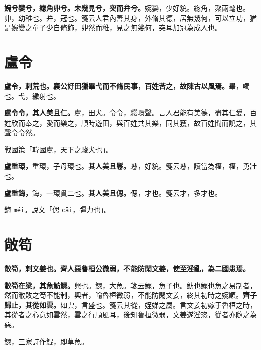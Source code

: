 \textbf{婉兮孌兮，緫角丱兮。未幾見兮，突而弁兮。}{\footnotesize 婉孌，少好貌。緫角，聚兩髦也。丱，幼稚也。弁，冠也。箋云人君內善其身，外脩其德，居無幾何，可以立功，猶是婉孌之童子少自脩飾，丱然而稚，見之無幾何，突耳加冠為成人也。}

\section{盧令}


\textbf{盧令，刺荒也。襄公好田獵畢弋而不脩民事，百姓苦之，故陳古以風焉。}{\footnotesize 畢，噣也。弋，繳射也。}

\textbf{盧令令，其人美且仁。}{\footnotesize 盧，田犬。令令，纓環聲。言人君能有美德，盡其仁愛，百姓欣而奉之，愛而樂之，順時遊田，與百姓共其樂，同其獲，故百姓聞而說之，其聲令令然。}

\begin{quoting}戰國策「韓國盧，天下之駿犬也」。\end{quoting}

\textbf{盧重環，}{\footnotesize 重環，子母環也。}\textbf{其人美且鬈。}{\footnotesize 鬈，好貌。箋云鬈，讀當為權，權，勇壯也。}

\textbf{盧重鋂，}{\footnotesize 鋂，一環貫二也。}\textbf{其人美且偲。}{\footnotesize 偲，才也。箋云才，多才也。}

\begin{quoting}鋂 \texttt{méi}。說文「偲 \texttt{cāi}，彊力也」。\end{quoting}

\section{敞笱}


\textbf{敞笱，刺文姜也。齊人惡魯桓公微弱，不能防閑文姜，使至淫亂，為二國患焉。}

\textbf{敝笱在梁，其魚魴鰥。}{\footnotesize 興也。鰥，大魚。箋云鰥，魚子也。魴也鰥也魚之易制者，然而敝敗之笱不能制，興者，喻魯桓微弱，不能防閑文姜，終其初時之婉順。}\textbf{齊子歸止，其從如雲。}{\footnotesize 如雲，言盛也。箋云其從，姪娣之屬。言文姜初嫁于魯桓之時，其從者之心意如雲然，雲之行順風耳，後知魯桓微弱，文姜遂淫恣，從者亦隨之為惡。}

\begin{quoting}鰥，三家詩作鯤，即草魚。\end{quoting}

